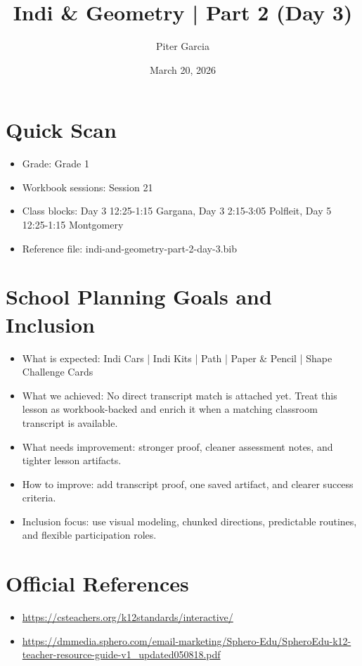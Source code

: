 \documentclass[11pt]{article}
\title{Indi & Geometry | Part 2 (Day 3)}
\author{Piter Garcia}
\date{March 20, 2026}
\begin{document}
    \maketitle
    \section*{Quick Scan}
    \begin{itemize}[leftmargin=*]
    \item Grade: Grade 1
    \item Workbook sessions: Session 21
    \item Class blocks: Day 3 12:25-1:15 Gargana, Day 3 2:15-3:05 Polfleit, Day 5 12:25-1:15 Montgomery
    \item Reference file: indi-and-geometry-part-2-day-3.bib
    \end{itemize}
    \section*{School Planning Goals and Inclusion}
    \begin{itemize}[leftmargin=*]
    \item What is expected: Indi Cars | Indi Kits | Path | Paper & Pencil | Shape Challenge Cards
    \item What we achieved: No direct transcript match is attached yet. Treat this lesson as workbook-backed and enrich it when a matching classroom transcript is available.
    \item What needs improvement: stronger proof, cleaner assessment notes, and tighter lesson artifacts.
    \item How to improve: add transcript proof, one saved artifact, and clearer success criteria.
    \item Inclusion focus: use visual modeling, chunked directions, predictable routines, and flexible participation roles.
    \end{itemize}
    \section*{Official References}
    \begin{itemize}[leftmargin=*]
    \item \url{https://csteachers.org/k12standards/interactive/}
\item \url{https://dmmedia.sphero.com/email-marketing/Sphero-Edu/SpheroEdu-k12-teacher-resource-guide-v1_updated050818.pdf}

    \end{itemize}
    
\end{document}
